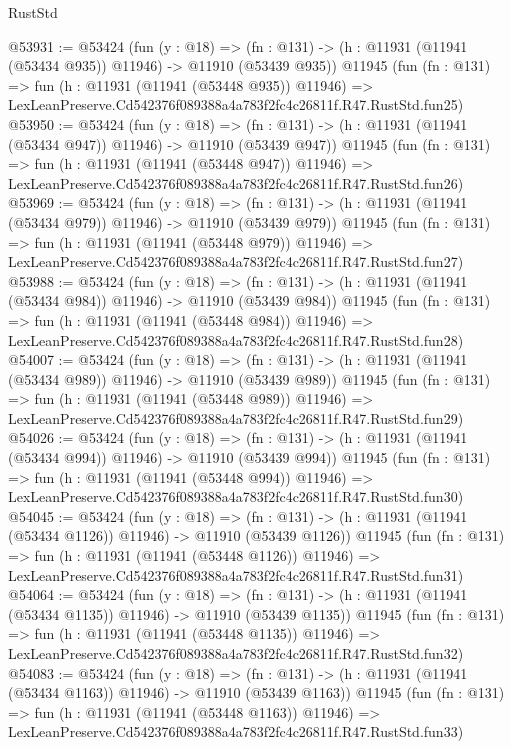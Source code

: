 \begin{lexlean}{RustStd}
\begin{coremodule}
@53931 := @53424
    (fun (y : @18) =>
    (fn : @131) -> (h : @11931 (@11941 (@53434 @935)) @11946) -> @11910 (@53439 @935))
    @11945
    (fun (fn : @131) =>
    fun (h : @11931 (@11941 (@53448 @935)) @11946) =>
    LexLeanPreserve.Cd542376f089388a4a783f2fc4c26811f.R47.RustStd.fun25)
@53950 := @53424
    (fun (y : @18) =>
    (fn : @131) -> (h : @11931 (@11941 (@53434 @947)) @11946) -> @11910 (@53439 @947))
    @11945
    (fun (fn : @131) =>
    fun (h : @11931 (@11941 (@53448 @947)) @11946) =>
    LexLeanPreserve.Cd542376f089388a4a783f2fc4c26811f.R47.RustStd.fun26)
@53969 := @53424
    (fun (y : @18) =>
    (fn : @131) -> (h : @11931 (@11941 (@53434 @979)) @11946) -> @11910 (@53439 @979))
    @11945
    (fun (fn : @131) =>
    fun (h : @11931 (@11941 (@53448 @979)) @11946) =>
    LexLeanPreserve.Cd542376f089388a4a783f2fc4c26811f.R47.RustStd.fun27)
@53988 := @53424
    (fun (y : @18) =>
    (fn : @131) -> (h : @11931 (@11941 (@53434 @984)) @11946) -> @11910 (@53439 @984))
    @11945
    (fun (fn : @131) =>
    fun (h : @11931 (@11941 (@53448 @984)) @11946) =>
    LexLeanPreserve.Cd542376f089388a4a783f2fc4c26811f.R47.RustStd.fun28)
@54007 := @53424
    (fun (y : @18) =>
    (fn : @131) -> (h : @11931 (@11941 (@53434 @989)) @11946) -> @11910 (@53439 @989))
    @11945
    (fun (fn : @131) =>
    fun (h : @11931 (@11941 (@53448 @989)) @11946) =>
    LexLeanPreserve.Cd542376f089388a4a783f2fc4c26811f.R47.RustStd.fun29)
@54026 := @53424
    (fun (y : @18) =>
    (fn : @131) -> (h : @11931 (@11941 (@53434 @994)) @11946) -> @11910 (@53439 @994))
    @11945
    (fun (fn : @131) =>
    fun (h : @11931 (@11941 (@53448 @994)) @11946) =>
    LexLeanPreserve.Cd542376f089388a4a783f2fc4c26811f.R47.RustStd.fun30)
@54045 := @53424
    (fun (y : @18) =>
    (fn : @131) -> (h : @11931 (@11941 (@53434 @1126)) @11946) -> @11910 (@53439 @1126))
    @11945
    (fun (fn : @131) =>
    fun (h : @11931 (@11941 (@53448 @1126)) @11946) =>
    LexLeanPreserve.Cd542376f089388a4a783f2fc4c26811f.R47.RustStd.fun31)
@54064 := @53424
    (fun (y : @18) =>
    (fn : @131) -> (h : @11931 (@11941 (@53434 @1135)) @11946) -> @11910 (@53439 @1135))
    @11945
    (fun (fn : @131) =>
    fun (h : @11931 (@11941 (@53448 @1135)) @11946) =>
    LexLeanPreserve.Cd542376f089388a4a783f2fc4c26811f.R47.RustStd.fun32)
@54083 := @53424
    (fun (y : @18) =>
    (fn : @131) -> (h : @11931 (@11941 (@53434 @1163)) @11946) -> @11910 (@53439 @1163))
    @11945
    (fun (fn : @131) =>
    fun (h : @11931 (@11941 (@53448 @1163)) @11946) =>
    LexLeanPreserve.Cd542376f089388a4a783f2fc4c26811f.R47.RustStd.fun33)

\end{coremodule}
\end{lexlean}
